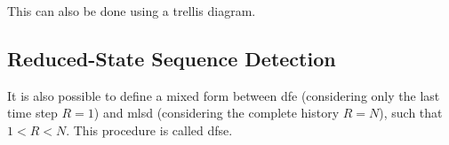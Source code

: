 This can also be done using a trellis diagram.

\subsection{Reduced-State Sequence Detection}
It is also possible to define a mixed form between \ac{dfe} (considering only the last time
step $R=1$) and \ac{mlsd} (considering the complete history $R=N$), such that $1 < R < N$.
This procedure is called \ac{dfse}.



